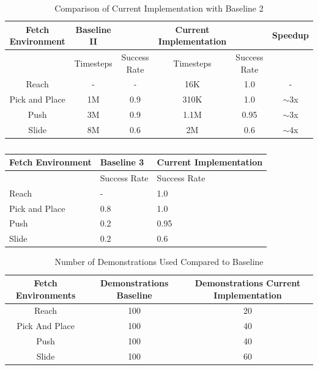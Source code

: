 \begin{table}[h!]
\begin{tabular}{|c|cc|cc|c|}
\hline
Fetch Environment & Baseline II             &     & Current Implementation    &      & Speedup  \\ \hline
               & \multicolumn{1}{c|}{Timesteps} & Success Rate & \multicolumn{1}{c|}{Timesteps} & Success Rate &          \\ \hline
Reach             & \multicolumn{1}{c|}{-}  & -   & \multicolumn{1}{c|}{16K}  & 1.0  & -        \\ \hline
Pick and Place & \multicolumn{1}{c|}{1M}        & 0.9          & \multicolumn{1}{c|}{310K}      & 1.0          & $\sim$3x \\ \hline
Push              & \multicolumn{1}{c|}{3M} & 0.9 & \multicolumn{1}{c|}{1.1M} & 0.95 & $\sim$3x \\ \hline
Slide             & \multicolumn{1}{c|}{8M} & 0.6 & \multicolumn{1}{c|}{2M}   & 0.6  & $\sim$4x \\ \hline
\end{tabular}
\caption{Comparison of Current Implementation with Baseline 2}
\label{tab:my-table2}
\end{table}

\begin{table}[h!]
\begin{tabular}{|l|l|l|}
\hline
Fetch Environment & Baseline 3   & Current Implementation \\ \hline
                  & Success Rate & Success Rate           \\ \hline
Reach             & -            & 1.0                    \\ \hline
Pick and Place    & 0.8          & 1.0                    \\ \hline
Push              & 0.2          & 0.95                   \\ \hline
Slide             & 0.2          & 0.6                    \\ \hline
\end{tabular}
\caption{}
\label{tab:my-table}
\end{table}

\begin{table}[h!]
\begin{tabular}{|c|c|c|}
\hline
Fetch Environments & Demonstrations Baseline & Demonstrations Current Implementation \\ \hline
Reach              & 100                     & 20                                    \\ \hline
Pick And Place     & 100                     & 40                                    \\ \hline
Push               & 100                     & 40                                    \\ \hline
Slide              & 100                     & 60                                    \\ \hline
\end{tabular}
\caption{Number of Demonstrations Used Compared to Baseline}
\label{tab:my-table3}
\end{table}